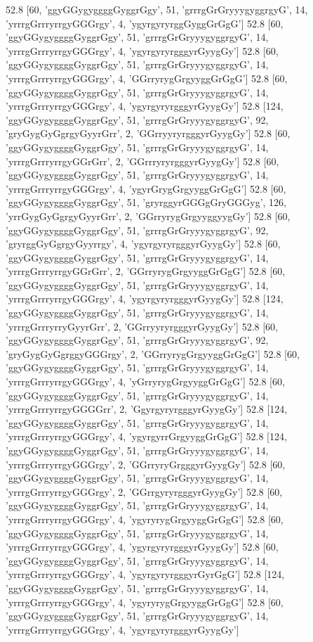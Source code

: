 52.8 [60, 'ggyGGygyggggGyggrGgy', 51, 'grrrgGrGryyygyggrgyG', 14, 'yrrrgGrrryrrgyGGGrgy', 4, 'ygyrgyryrggGyggGrGgG']
52.8 [60, 'ggyGGygyggggGyggrGgy', 51, 'grrrgGrGryyygyggrgyG', 14, 'yrrrgGrrryrrgyGGGrgy', 4, 'ygyrgyryrgggyrGyygGy']
52.8 [60, 'ggyGGygyggggGyggrGgy', 51, 'grrrgGrGryyygyggrgyG', 14, 'yrrrgGrrryrrgyGGGrgy', 4, 'GGrryrygGrgyyggGrGgG']
52.8 [60, 'ggyGGygyggggGyggrGgy', 51, 'grrrgGrGryyygyggrgyG', 14, 'yrrrgGrrryrrgyGGGrgy', 4, 'ygyrgyryrgggyrGyygGy']
52.8 [124, 'ggyGGygyggggGyggrGgy', 51, 'grrrgGrGryyygyggrgyG', 92, 'gryGygGyGgrgyGyyrGrr', 2, 'GGrryyryrgggyrGyygGy']
52.8 [60, 'ggyGGygyggggGyggrGgy', 51, 'grrrgGrGryyygyggrgyG', 14, 'yrrrgGrrryrrgyGGrGrr', 2, 'GGrrryryrgggyrGyygGy']
52.8 [60, 'ggyGGygyggggGyggrGgy', 51, 'grrrgGrGryyygyggrgyG', 14, 'yrrrgGrrryrrgyGGGrgy', 4, 'ygyrGrygGrgyyggGrGgG']
52.8 [60, 'ggyGGygyggggGyggrGgy', 51, 'gryrggyrGGGgGryGGGyg', 126, 'yrrGygGyGgrgyGyyrGrr', 2, 'GGrryrygGrgyyggyygGy']
52.8 [60, 'ggyGGygyggggGyggrGgy', 51, 'grrrgGrGryyygyggrgyG', 92, 'gryrggGyGgrgyGyyrrgy', 4, 'ygyrgyryrgggyrGyygGy']
52.8 [60, 'ggyGGygyggggGyggrGgy', 51, 'grrrgGrGryyygyggrgyG', 14, 'yrrrgGrrryrrgyGGrGrr', 2, 'GGrryrygGrgyyggGrGgG']
52.8 [60, 'ggyGGygyggggGyggrGgy', 51, 'grrrgGrGryyygyggrgyG', 14, 'yrrrgGrrryrrgyGGGrgy', 4, 'ygyrgyryrgggyrGyygGy']
52.8 [124, 'ggyGGygyggggGyggrGgy', 51, 'grrrgGrGryyygyggrgyG', 14, 'yrrrgGrrryrryGyyrGrr', 2, 'GGrryyryrgggyrGyygGy']
52.8 [60, 'ggyGGygyggggGyggrGgy', 51, 'grrrgGrGryyygyggrgyG', 92, 'gryGygGyGgrggyGGGrgy', 2, 'GGrryrygGrgyyggGrGgG']
52.8 [60, 'ggyGGygyggggGyggrGgy', 51, 'grrrgGrGryyygyggrgyG', 14, 'yrrrgGrrryrrgyGGGrgy', 4, 'yGrryrygGrgyyggGrGgG']
52.8 [60, 'ggyGGygyggggGyggrGgy', 51, 'grrrgGrGryyygyggrgyG', 14, 'yrrrgGrrryrrgyGGGGrr', 2, 'GgyrgyryrgggyrGyygGy']
52.8 [124, 'ggyGGygyggggGyggrGgy', 51, 'grrrgGrGryyygyggrgyG', 14, 'yrrrgGrrryrrgyGGGrgy', 4, 'ygyrgyrrGrgyyggGrGgG']
52.8 [124, 'ggyGGygyggggGyggrGgy', 51, 'grrrgGrGryyygyggrgyG', 14, 'yrrrgGrrryrrgyGGGrgy', 2, 'GGrryryGrgggyrGyygGy']
52.8 [60, 'ggyGGygyggggGyggrGgy', 51, 'grrrgGrGryyygyggrgyG', 14, 'yrrrgGrrryrrgyGGGrgy', 2, 'GGrrgyryrgggyrGyygGy']
52.8 [60, 'ggyGGygyggggGyggrGgy', 51, 'grrrgGrGryyygyggrgyG', 14, 'yrrrgGrrryrrgyGGGrgy', 4, 'ygyryrygGrgyyggGrGgG']
52.8 [60, 'ggyGGygyggggGyggrGgy', 51, 'grrrgGrGryyygyggrgyG', 14, 'yrrrgGrrryrrgyGGGrgy', 4, 'ygyrgyryrgggyrGyygGy']
52.8 [60, 'ggyGGygyggggGyggrGgy', 51, 'grrrgGrGryyygyggrgyG', 14, 'yrrrgGrrryrrgyGGGrgy', 4, 'ygyrgyryrgggyrGyrGgG']
52.8 [124, 'ggyGGygyggggGyggrGgy', 51, 'grrrgGrGryyygyggrgyG', 14, 'yrrrgGrrryrrgyGGGrgy', 4, 'ygyryrygGrgyyggGrGgG']
52.8 [60, 'ggyGGygyggggGyggrGgy', 51, 'grrrgGrGryyygyggrgyG', 14, 'yrrrgGrrryrrgyGGGrgy', 4, 'ygyrgyryrgggyrGyygGy']
